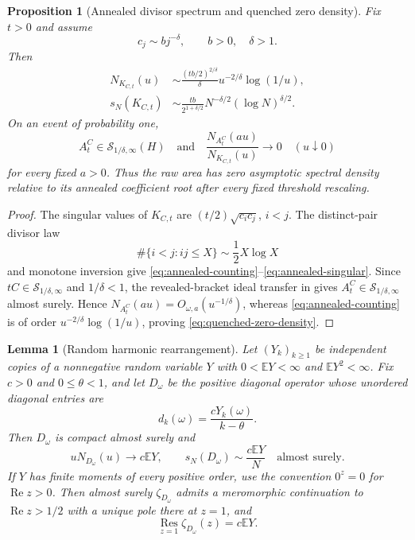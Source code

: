 \documentclass[10pt,reqno]{amsart}
\theoremstyle{plain}
\newtheorem{proposition}[theorem]{Proposition}
\newtheorem{lemma}[theorem]{Lemma}
\theoremstyle{definition}
\theoremstyle{remark}
\begin{document}
\begin{proposition}[Annealed divisor spectrum and quenched zero density]
\label{prop:brownian-zero-density}
Fix $t>0$ and assume
\begin{equation}
 c_j\sim b j^{-\delta},\qquad b>0,\quad\delta>1.
 \label{eq:brownian-polynomial-covariance}
\end{equation}
Then
\begin{align}
 N_{K_{C,t}}(u)
 &\sim\frac{(tb/2)^{2/\delta}}{\delta}
 u^{-2/\delta}\log(1/u),
 \label{eq:annealed-counting}\\
 s_N(K_{C,t})
 &\sim\frac{tb}{2^{1+\delta/2}}
 N^{-\delta/2}(\log N)^{\delta/2}.
 \label{eq:annealed-singular}
\end{align}
On an event of probability one,
\begin{equation}
 A_t^C\in\mathcal S_{1/\delta,\infty}(H)
 \quad\text{and}\quad
 \frac{N_{A_t^C}(au)}{N_{K_{C,t}}(u)}\longrightarrow0
 \quad(u\downarrow0)
 \label{eq:quenched-zero-density}
\end{equation}
for every fixed $a>0$.  Thus the raw area has zero asymptotic spectral
density relative to its annealed coefficient root after every fixed threshold
rescaling.
\end{proposition}

\begin{proof}
The singular values of $K_{C,t}$ are
$(t/2)\sqrt{c_ic_j}$, $i<j$.  The distinct-pair divisor law
\[
 \#\{i<j:ij\le X\}\sim\frac12X\log X
\]
and monotone inversion give
\eqref{eq:annealed-counting}--\eqref{eq:annealed-singular}.  Since
$tC\in\mathcal S_{1/\delta,\infty}$ and $1/\delta<1$, the revealed-bracket
ideal transfer in  gives
$A_t^C\in\mathcal S_{1/\delta,\infty}$ almost surely.  Hence
$N_{A_t^C}(au)=O_{\omega,a}(u^{-1/\delta})$, whereas
\eqref{eq:annealed-counting} is of order
$u^{-2/\delta}\log(1/u)$, proving \eqref{eq:quenched-zero-density}.
\end{proof}

\begin{lemma}[Random harmonic rearrangement]
\label{lem:random-harmonic-rearrangement}
Let $(Y_k)_{k\ge1}$ be independent copies of a nonnegative random variable
$Y$ with $0<\mathbb EY<\infty$ and $\mathbb EY^2<\infty$.  Fix $c>0$ and
$0\le\theta<1$, and let $D_\omega$ be the positive diagonal operator whose
unordered diagonal entries are
\[
 d_k(\omega)=\frac{cY_k(\omega)}{k-\theta}.
\]
Then $D_\omega$ is compact almost surely and
\begin{equation}
 uN_{D_\omega}(u)\longrightarrow c\mathbb EY,
 \qquad
 s_N(D_\omega)\sim\frac{c\mathbb EY}{N}
 \quad\text{almost surely}.
 \label{eq:random-harmonic-rearrangement}
\end{equation}
If $Y$ has finite moments of every positive order, use the convention
$0^z=0$ for $\operatorname{Re}z>0$.  Then almost surely
$\zeta_{D_\omega}$ admits a meromorphic continuation to
$\operatorname{Re}z>1/2$ with a unique pole there at $z=1$, and
\begin{equation}
 \operatorname*{Res}_{z=1}\zeta_{D_\omega}(z)=c\mathbb EY.
 \label{eq:random-harmonic-residue}
\end{equation}
\end{lemma}
\end{document}
